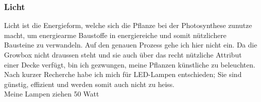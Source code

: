 \documentclass[12pt,titlepage,a4paper]{article}
\begin{document}
\subsubsection{Licht}
Licht ist die Energieform, welche sich die Pflanze bei der Photosynthese zunutze macht, um energiearme Baustoffe in energiereiche und somit nützlichere Bausteine zu verwandeln. Auf den genauen Prozess gehe ich hier nicht ein. Da die Growbox nicht draussen steht und sie auch über das recht nützliche Attribut einer Decke verfügt, bin ich gezwungen, meine Pflanzen künstliche zu beleuchten. Nach kurzer Recherche habe ich mich für LED-Lampen entschieden; Sie sind günstig, effizient und werden somit auch nicht zu heiss.\\ Meine Lampen ziehen 50 Watt


%

\end{document}

